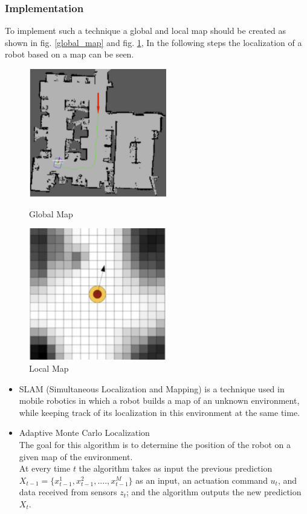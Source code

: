 \subsubsection*{Implementation}
To implement such a technique a global and local map should be created as shown in fig. \ref{global_map} and fig. \ref{local_map}, In the following steps the localization of a robot based on a map can be seen.
\begin{figure}[!htbp]
	\centering
	\begin{minipage}{.5\textwidth}
		\centering
		\includegraphics[width = 6cm]{Pictures/global}%
		\caption[The ListOfFigures caption]{Global Map \footnotemark[1]}
		\label{global_map}
	\end{minipage}%
	\begin{minipage}{.5\textwidth}
		\centering
		\includegraphics[width = 6cm]{Pictures/local}%
		\caption[The ListOfFigures caption]{Local Map \footnotemark[1]}
		\label{local_map}
	\end{minipage}
\end{figure}
\begin{itemize}
\item SLAM (Simultaneous Localization and Mapping) is a technique used in mobile robotics in which a robot builds a map of an unknown environment, while keeping track of its localization in this environment at the same time.
\end{itemize}
\begin{itemize}
\item Adaptive Monte Carlo Localization
\\
The goal for this algorithm is to determine the position of the robot on a given map of the environment.
\\
At every time \(t\) the algorithm takes as input the previous prediction \(X_{t-1}=\big\{x_{t-1}^1, x_{t-1}^2, ...., x_{t-1}^M\big\} \) as an input,  an actuation command \(u_t\), and data received from sensors \(z_t\); and the algorithm outputs the new prediction \(X_t\).
\end{itemize}
